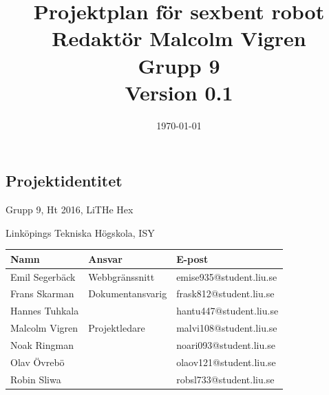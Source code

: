 \documentclass[a4paper,titlepage,12pt]{article}
\begin{document}
    \title{\LARGE
        \textbf{Projektplan för sexbent robot} \\
        \vspace*{0.5\baselineskip}
        \large
        Redaktör Malcolm Vigren \\
        Grupp 9 \\
        \small
        \vspace*{0.5\baselineskip}
        Version 0.1}

    \date{\today}

	\maketitle
	
	\newpage
	
	\begin{center}


		\section*{Projektidentitet}
		Grupp 9, Ht 2016, LiTHe Hex

		Linköpings Tekniska Högskola, ISY

		\begin{table}[h]
			\begin{center}
				\begin{tabular}[pos]{ l l l }
					\textbf{Namn} & \textbf{Ansvar} & \textbf{E-post} \\ \midrule
					Emil Segerbäck & Webbgränssnitt & emise935@student.liu.se \\ \midrule
					Frans Skarman & Dokumentansvarig & frask812@student.liu.se \\ \midrule
					Hannes Tuhkala & & hantu447@student.liu.se \\ \midrule
					Malcolm Vigren & Projektledare & malvi108@student.liu.se \\ \midrule
					Noak Ringman &  & noari093@student.liu.se \\ \midrule
					Olav Övrebö &  & olaov121@student.liu.se \\ \midrule
					Robin Sliwa &  & robsl733@student.liu.se \\
				\end{tabular}
			\end{center}
		\end{table}


\end{center}
\end{document}

